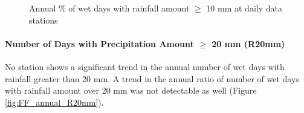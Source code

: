 \begin{figure}[htbp]

  \caption{Annual \% of wet days with rainfall amount $\geq$ 10 mm at
daily data stations}
  \label{fig:FF_annual_R10p}
\end{figure}

\paragraph{Number of Days with Precipitation Amount $\geq$ 20 mm (R20mm)}
\label{sec:R20}
No station shows a significant trend in the annual number of wet days with
rainfall greater than 20 mm. A trend in the annual ratio of number of wet days
with rainfall amount over 20 mm was not detectable as well (Figure
\ref{fig:FF_annual_R20mm}).

